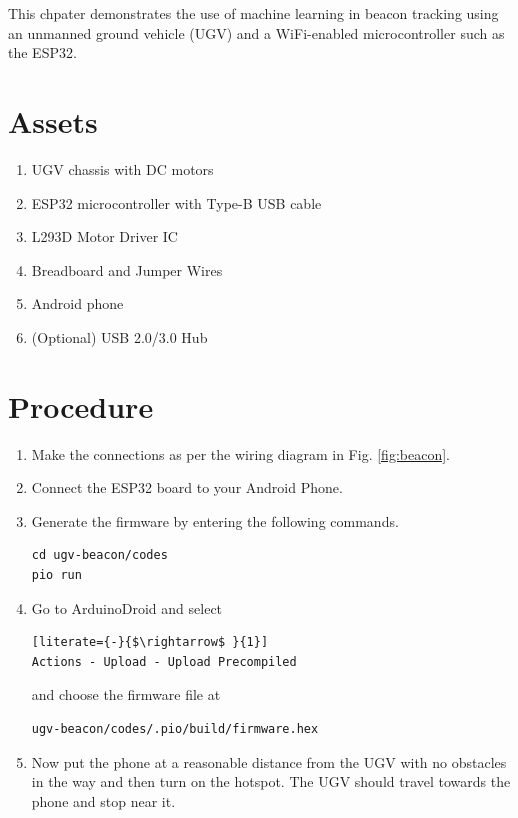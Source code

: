 This chpater demonstrates the use of machine learning in beacon tracking using 
an unmanned ground vehicle (UGV) and a WiFi-enabled microcontroller such as the 
ESP32.

\section{Assets}
\begin{enumerate}
    \item UGV chassis with DC motors
    \item ESP32 microcontroller with Type-B USB cable
    \item L293D Motor Driver IC
    \item Breadboard and Jumper Wires
    \item Android phone
    \item (Optional) USB 2.0/3.0 Hub
\end{enumerate}

\section{Procedure}
\begin{enumerate}
    \item Make the connections as per the wiring diagram in Fig. \ref{fig:beacon}.
    \item Connect the ESP32 board to your Android Phone.
    \item Generate the firmware by entering the following commands.
        \begin{lstlisting}
cd ugv-beacon/codes
pio run
        \end{lstlisting}
    \item Go to ArduinoDroid and select
        \begin{lstlisting}[literate={-}{$\rightarrow$ }{1}]
Actions - Upload - Upload Precompiled
        \end{lstlisting}
    and choose the firmware file at
        \begin{lstlisting}
ugv-beacon/codes/.pio/build/firmware.hex
        \end{lstlisting}
    \item Now put the phone at a reasonable distance from the UGV with no 
    obstacles in the way and then turn on the hotspot. The UGV should travel
    towards the phone and stop near it.
\end{enumerate}

